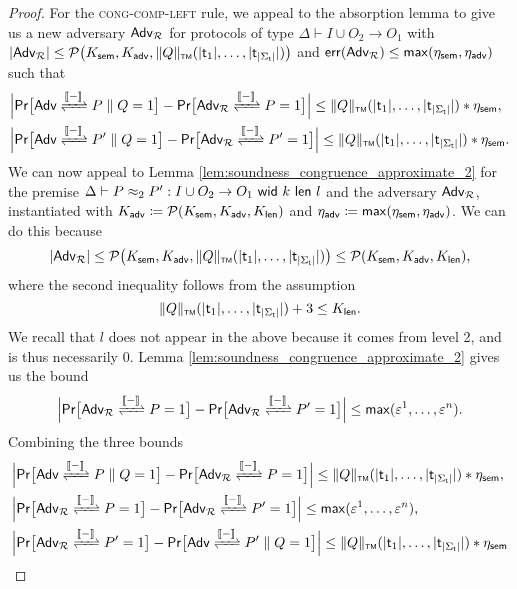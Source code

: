 \begin{proof}
For the \textsc{cong-comp-left} rule, we appeal to the absorption lemma to give us a new adversary $\Adv_\mathcal{R}$ for protocols of type $\Delta \vdash I \cup O_2 \to O_1$ with $|\Adv_\mathcal{R}| \leq \mathcal{P}\big(K_\sem,K_\adv,\tmnorm{Q}(|\type_1|,\ldots,|\type_{|\Sigma_\mathsf{t}|}|)\big)$ and $\err(\Adv_\mathcal{R}) \leq \max(\eta_\sem,\eta_\adv)$ such that
\begin{align*}
& \Big|\mathsf{Pr}\big[\interaction{\Adv}{\Par{P}{Q}}{\int{-}} = 1\big] - \mathsf{Pr}\big[\interaction{\Adv_\mathcal{R}}{P}{\int{-}} = 1\big]\Big| \leq \tmnorm{Q}(|\type_1|,\ldots,|\type_{|\Sigma_\mathsf{t}|}|) * \eta_\sem, \\
& \Big|\mathsf{Pr}\big[\interaction{\Adv}{\Par{P'}{Q}}{\int{-}} = 1\big] - \mathsf{Pr}\big[\interaction{\Adv_\mathcal{R}}{P'}{\int{-}} = 1\big]\Big| \leq \tmnorm{Q}(|\type_1|,\ldots,|\type_{|\Sigma_\mathsf{t}|}|) * \eta_\sem.
\end{align*}
We can now appeal to Lemma \ref{lem:soundness_congruence_approximate_2} for the premise $\Delta \vdash \lapproxeq{P}{P'}{I \cup O_2}{O_1}{k}{l}{2}$ and the adversary $\Adv_\mathcal{R}$, instantiated with $K_\adv \coloneqq \mathcal{P}(K_\sem,K_\adv,K_\length)$ and $\eta_\adv \coloneqq \max(\eta_\sem,\eta_\adv)$.
We can do this because
\[|\Adv_\mathcal{R}| \leq \mathcal{P}\big(K_\sem,K_\adv,\tmnorm{Q}(|\type_1|,\ldots,|\type_{|\Sigma_\mathsf{t}|}|)\big) \leq \mathcal{P}(K_\sem,K_\adv,K_\length),\]
where the second inequality follows from the assumption
\[\tmnorm{Q}(|\type_1|,\ldots,|\type_{|\Sigma_\mathsf{t}|}|) + 3 \leq K_\length.\]
We recall that $l$ does not appear in the above because it comes from level 2, and is thus necessarily $0$. Lemma \ref{lem:soundness_congruence_approximate_2} gives us the bound
\[\Big|\mathsf{Pr}\big[\interaction{\Adv_\mathcal{R}}{P}{\int{-}} = 1\big] - \mathsf{Pr}\big[\interaction{\Adv_\mathcal{R}}{P'}{\int{-}} = 1\big]\Big| \leq \max(\varepsilon^1,\ldots,\varepsilon^n).\]
Combining the three bounds
\begin{align*}
& \Big|\mathsf{Pr}\big[\interaction{\Adv}{\Par{P}{Q}}{\int{-}} = 1\big] - \mathsf{Pr}\big[\interaction{\Adv_\mathcal{R}}{P}{\int{-}} = 1\big]\Big| \leq \tmnorm{Q}(|\type_1|,\ldots,|\type_{|\Sigma_\mathsf{t}|}|) * \eta_\sem, \\
& \Big|\mathsf{Pr}\big[\interaction{\Adv_\mathcal{R}}{P}{\int{-}} = 1\big] - \mathsf{Pr}\big[\interaction{\Adv_\mathcal{R}}{P'}{\int{-}} = 1\big]\Big| \leq \max(\varepsilon^1,\ldots,\varepsilon^n), \\
& \Big|\mathsf{Pr}\big[\interaction{\Adv_\mathcal{R}}{P'}{\int{-}} = 1\big] - \mathsf{Pr}\big[\interaction{\Adv}{\Par{P'}{Q}}{\int{-}} = 1\big]\Big| \leq \tmnorm{Q}(|\type_1|,\ldots,|\type_{|\Sigma_\mathsf{t}|}|) * \eta_\sem

\end{align*}
\end{proof}
